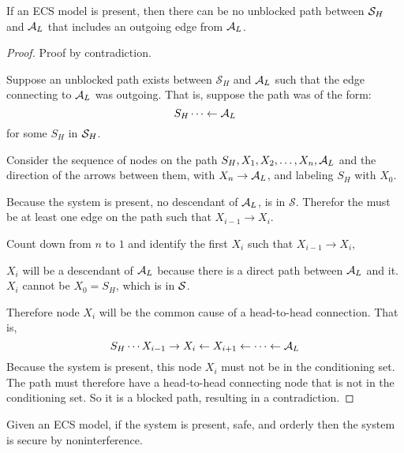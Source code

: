 \documentclass[../thesis.tex]{subfiles}
\begin{document}
\begin{lem}
  \label{lem:present}
  If an ECS model is present,
  then there can be no unblocked path between
  $\mathcal{S}_H$ and $\mathcal{A}_L$ that includes an outgoing
  edge from $\mathcal{A}_L$.
\end{lem}
\begin{proof}
  Proof by contradiction.
  
  Suppose an unblocked path exists
  between $\mathcal{S}_H$ and $\mathcal{A}_L$
  such that the edge connecting to $\mathcal{A}_L$ was outgoing.
  That is, suppose the path was of the form:
  $$S_H \cdots \leftarrow \mathcal{A}_L$$
  for some $S_H$ in $\mathcal{S}_H$.

  Consider the sequence of nodes on the path
  $S_H, X_1, X_2, \ldots, X_n, \mathcal{A}_L$ and the direction of
  the arrows between them, with $X_n \rightarrow \mathcal{A}_L$,
  and labeling
  $S_H$ with $X_0$.

  Because the system is present, no descendant of $\mathcal{A}_L$,
  is in $\mathcal{S}$.
  Therefor the must be at least one edge on the path
  such that $X_{i-1} \rightarrow X_i$.

  Count down from $n$ to $1$ and identify the first
  $X_i$ such that $X_{i-1} \rightarrow X_i$, 
 
  $X_i$ will be a descendant of $\mathcal{A}_L$ because
  there is a direct path between $\mathcal{A}_L$ and it.
  $X_i$ cannot be $X_0 = S_H$, which is in $\mathcal{S}$.

  Therefore node $X_i$ will be the common cause of a
  head-to-head connection.  That is,
  \[S_H \cdots X_{i-1} \rightarrow X_i \leftarrow X_{i+1} \leftarrow \cdots \leftarrow \mathcal{A}_L \]
  Because the system is present, this node
  $X_i$ must not be in the conditioning set.
  The path must therefore have a head-to-head
  connecting node that is not in the conditioning
  set.
  So it is a blocked path, resulting in a contradiction.
\end{proof}

\begin{thm}
  \label{thm:ecs-noninterference}
  Given an ECS model,
  if the system is present, safe, and orderly
  then the system
  is secure by noninterference.
\end{thm}
\end{document}
